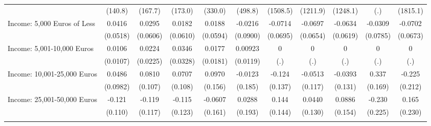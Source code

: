 {\begin{tabular}{l*{10}{c}}
            &     (140.8)         &     (167.7)         &     (173.0)         &     (330.0)         &     (498.8)         &    (1508.5)         &    (1211.9)         &    (1248.1)         &         (.)         &    (1815.1)         \\
\addlinespace
Income: 5,000 Euros of Less&      0.0416         &      0.0295         &      0.0182         &      0.0188         &     -0.0216         &     -0.0714         &     -0.0697         &     -0.0634         &     -0.0309         &     -0.0702         \\
            &    (0.0518)         &    (0.0606)         &    (0.0610)         &    (0.0594)         &    (0.0900)         &    (0.0695)         &    (0.0654)         &    (0.0619)         &    (0.0785)         &    (0.0673)         \\
\addlinespace
Income: 5,001-10,000 Euros&      0.0106         &      0.0224         &      0.0346         &      0.0177         &     0.00923         &           0         &           0         &           0         &           0         &           0         \\
            &    (0.0107)         &    (0.0225)         &    (0.0328)         &    (0.0181)         &    (0.0119)         &         (.)         &         (.)         &         (.)         &         (.)         &         (.)         \\
\addlinespace
Income: 10,001-25,000 Euros&      0.0486         &      0.0810         &      0.0707         &      0.0970         &     -0.0123         &      -0.124         &     -0.0513         &     -0.0393         &       0.337\sym{*}  &      -0.225         \\
            &    (0.0982)         &     (0.107)         &     (0.108)         &     (0.156)         &     (0.185)         &     (0.137)         &     (0.117)         &     (0.131)         &     (0.169)         &     (0.212)         \\
\addlinespace
Income: 25,001-50,000 Euros&      -0.121         &      -0.119         &      -0.115         &     -0.0607         &      0.0288         &       0.144         &      0.0440         &      0.0886         &      -0.230         &       0.165         \\
            &     (0.110)         &     (0.117)         &     (0.123)         &     (0.161)         &     (0.193)         &     (0.144)         &     (0.130)         &     (0.154)         &     (0.225)         &     (0.230)         \\
\addlinespace

\end{tabular}}
